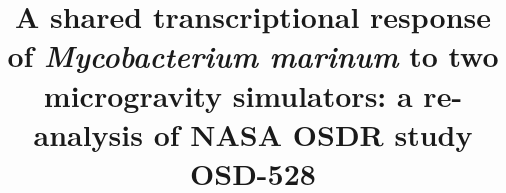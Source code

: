 
\title{A shared transcriptional response of \textit{Mycobacterium marinum} to two microgravity simulators: a re-analysis of NASA OSDR study OSD-528}
